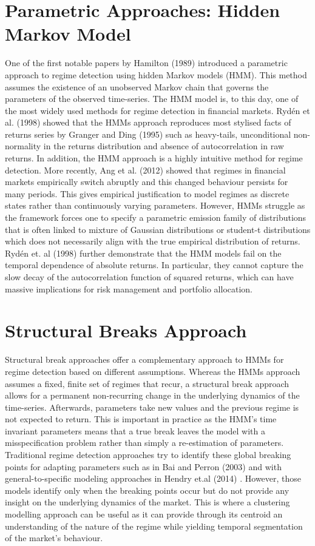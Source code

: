 \documentclass[12pt,a4paper]{report}
\begin{document}
\section{Parametric Approaches: Hidden Markov Model}
One of the first notable papers by Hamilton (1989) \cite{Hamilton1989} introduced a parametric approach to regime detection using hidden Markov models (HMM). 
This method assumes the existence of an unobserved Markov chain that governs the parameters of the observed time-series.
The HMM model is, to this day, one of the most widely used methods for regime detection in financial markets.
Rydén et al. (1998) \cite{Rydén1998} showed that the HMMs approach reproduces most stylised facts of returns series by Granger and Ding (1995) \cite{GrangerDing1995} such as heavy-tails, unconditional non-normality in the returns distribution and absence of autocorrelation in raw returns. In addition, the HMM approach is a highly intuitive method for regime detection.
More recently, Ang et al. (2012) \cite{AngTimmermann2012} showed that regimes in financial markets empirically switch abruptly and this changed behaviour persists for many periods. This gives empirical justification to model
regimes as discrete states rather than continuously varying parameters.
However, HMMs struggle as the framework forces one to specify a parametric emission family of distributions that is often linked to mixture of Gaussian distributions or student-t distributions which does not necessarily align with the true empirical distribution of returns.
Rydén et. al (1998) \cite{Rydén1998} further demonstrate that the HMM models fail on the temporal dependence of absolute returns. 
In particular, they cannot capture the slow decay of the autocorrelation function of squared returns, which can have massive implications for risk management and portfolio allocation.

\section{Structural Breaks Approach}
Structural break approaches offer a complementary approach to HMMs for regime detection based on different assumptions.
Whereas the HMMs approach assumes a fixed, finite set of regimes that recur, a structural break approach allows for a permanent non-recurring change in the underlying dynamics of the time-series.
Afterwards, parameters take new values and the previous regime is not expected to return. 
This is important in practice as the HMM's time invariant parameters means that a true break leaves the model with a misspecification problem rather than simply a re-estimation of parameters.
Traditional regime detection approaches try to identify these global breaking points for adapting parameters such as in Bai and Perron (2003) \cite{BaiPerron2003} and with general-to-specific modeling approaches in Hendry et.al (2014) \cite{Hendry2014}.
However, those models identify only when the breaking points occur but do not provide any insight on the underlying dynamics of the market.
This is where a clustering modelling approach can be useful as it can provide through its centroid an understanding of the nature of the regime while yielding temporal segmentation of the market's behaviour.
\end{document}
